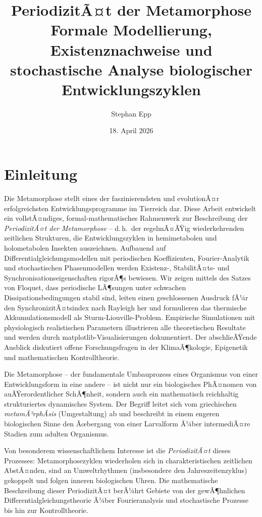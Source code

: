 ﻿\documentclass[12pt, a4paper]{article}
\title{\textbf{PeriodizitÃ¤t der Metamorphose}\\[-0.1em] Formale Modellierung, Existenznachweise und
stochastische Analyse biologischer Entwicklungszyklen}
\author{Stephan Epp}
\date{18. April 2026}
\theoremstyle{definition}
\begin{document}
\maketitle
\tableofcontents
\newpage

\section{Einleitung}
Die Metamorphose stellt eines der faszinierendsten und evolutionÃ¤r erfolgreichsten
Entwicklungsprogramme im Tierreich dar. Diese Arbeit entwickelt ein vollstÃ¤ndiges,
formal-mathematisches Rahmenwerk zur Beschreibung der \emph{PeriodizitÃ¤t der
Metamorphose} -- d.\,h.\ der regelmÃ¤ÃŸig wiederkehrenden zeitlichen Strukturen,
die Entwicklungszyklen in hemimetabolen und holometabolen Insekten auszeichnen.
Aufbauend auf Differentialgleichungsmodellen mit periodischen Koeffizienten,
Fourier-Analytik und stochastischen Phasenmodellen werden Existenz-, StabilitÃ¤ts-
und Synchronisationseigenschaften rigorÃ¶s bewiesen. Wir zeigen mittels des
Satzes von Floquet, dass periodische LÃ¶sungen unter schwachen Dissipationsbedingungen
stabil sind, leiten einen geschlossenen Ausdruck fÃ¼r den SynchronizitÃ¤tsindex
nach Rayleigh her und formulieren das thermische Akkumulationsmodell als
Sturm-Liouville-Problem. Empirische Simulationen mit physiologisch realistischen
Parametern illustrieren alle theoretischen Resultate und werden durch
matplotlib-Visualisierungen dokumentiert. Der abschlieÃŸende Ausblick diskutiert
offene Forschungsfragen in der KlimaÃ¶kologie, Epigenetik und mathematischen
Kontrolltheorie.

Die Metamorphose -- der fundamentale Umbauprozess eines Organismus von einer
Entwicklungsform in eine andere -- ist nicht nur ein biologisches PhÃ¤nomen von
auÃŸerordentlicher SchÃ¶nheit, sondern auch ein mathematisch reichhaltig strukturiertes
dynamisches System. Der Begriff leitet sich vom griechischen \emph{metamÃ³rphÅsis}
(Umgestaltung) ab und beschreibt in einem engeren biologischen Sinne den Ãœbergang
von einer Larvalform Ã¼ber intermediÃ¤re Stadien zum adulten Organismus.

Von besonderem wissenschaftlichem Interesse ist die \emph{PeriodizitÃ¤t} dieses
Prozesses: Metamorphosezyklen wiederholen sich in charakteristischen zeitlichen
AbstÃ¤nden, sind an Umweltrhythmen (insbesondere den Jahreszeitenzyklus) gekoppelt
und folgen inneren biologischen Uhren. Die mathematische Beschreibung dieser
PeriodizitÃ¤t berÃ¼hrt Gebiete von der gewÃ¶hnlichen Differentialgleichungstheorie
Ã¼ber Fourieranalysis und stochastische Prozesse bis hin zur Kontrolltheorie.
\end{document}
